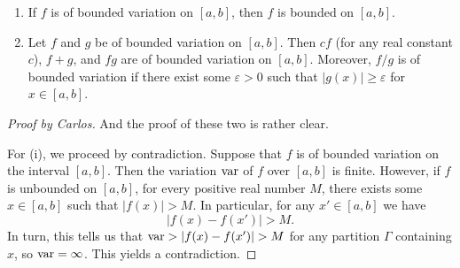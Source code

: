 \begin{theorem}[2.1]
\begin{enumerate}[label=\textnormal{(\roman*)}]
\item If $f$ is of bounded variation on $[a,b]$, then $f$ is bounded on
  $[a,b]$.
\item Let $f$ and $g$ be of bounded variation on $[a,b]$. Then $cf$ (for
  any real constant $c$), $f+g$, and $fg$ are of bounded variation on
  $[a,b]$. Moreover, $f/g$ is of bounded variation if there exist some
  $\varepsilon>0$ such that $|g(x)|\geq\varepsilon$ for $x\in[a,b]$.
\end{enumerate}
\end{theorem}
\begin{proof}[Proof by Carlos]
And the proof of these two is rather clear.

For (i), we proceed by contradiction. Suppose that $f$ is of bounded
variation on the interval $[a,b]$. Then the variation $\operatorname{var}$ of $f$ over
$[a,b]$ is finite. However, if $f$ is unbounded on $[a,b]$, for every
positive real number $M$, there exists some $x\in[a,b]$ such that
$|f(x)|>M$. In particular, for any $x'\in [a,b]$ we have
\[
|f(x)-f(x')|>M.
\]
In turn, this tells us that $\var>|f(x)-f(x')|>M$ for any partition $\Gamma$
containing $x$, so $\operatorname{var}=\infty$. This yields a contradiction.


\end{proof}
